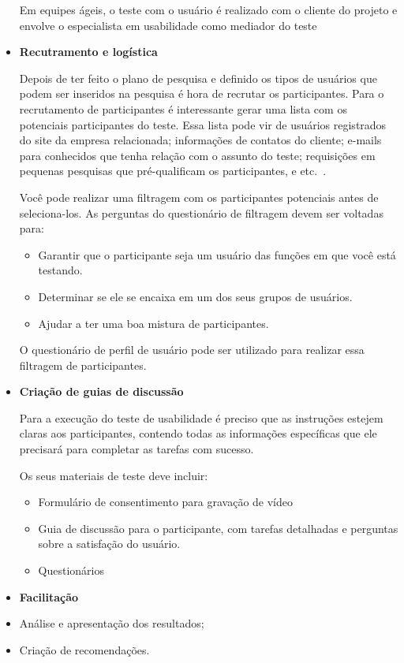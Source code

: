 \begin{itemize}
	Em equipes ágeis, o teste com o usuário é realizado com o cliente do projeto e envolve o especialista em usabilidade como mediador do teste ~\cite{santos2012}

\item \textbf{Recutramento e logística}

Depois de ter feito o plano de pesquisa e definido os tipos de usuários que podem ser inseridos na pesquisa é hora de recrutar os participantes.
Para o recrutamento de participantes é interessante gerar uma lista com os potenciais participantes do teste. Essa lista pode vir de usuários registrados do site da empresa relacionada; informações de contatos do cliente; e-mails para conhecidos que tenha relação com o assunto do teste; requisições em pequenas pesquisas que pré-qualificam os participantes, e etc.~\cite{unger2009}.

Você pode realizar uma filtragem com os participantes potenciais antes de seleciona-los. As perguntas do questionário de filtragem devem ser voltadas para:

	\begin{itemize}
	\item Garantir que o participante seja um usuário das funções em que você está testando.
	\item Determinar se ele se encaixa em um dos seus grupos de usuários.
	\item Ajudar a ter uma boa mistura de participantes.
	\end{itemize}

O questionário de perfil de usuário pode ser utilizado para realizar essa filtragem de participantes.


\item \textbf{Criação de guias de discussão}

Para a execução do teste de usabilidade é preciso que as instruções estejem claras aos participantes, contendo todas as informações específicas que ele precisará para completar as tarefas com sucesso.

Os seus materiais de teste deve incluir:

	\begin{itemize}
		\item Formulário de consentimento para gravação de vídeo
		\item Guia de discussão para o participante, com tarefas detalhadas e perguntas sobre a satisfação do usuário.
		\item Questionários
	\end{itemize}

\item \textbf{Facilitação}

\item Análise e apresentação dos resultados;
\item Criação de recomendações.

\end{itemize}


